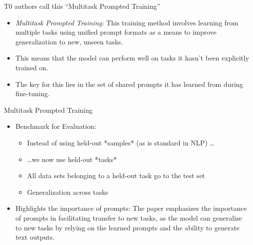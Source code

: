 
\begin{frame}{T0 authors call this ``Multitask Prompted
		Training''}

\vfill

\begin{itemize}
    \item \textit{Multitask Prompted Training:} This
    training method involves learning from multiple
    tasks using unified prompt formats as a means to improve
    generalization to new, unseen tasks.
    \item This means that the model can perform well on tasks it hasn't been explicitly trained on.
    \item The key for this lies in the set of shared prompts it has learned from during fine-tuning.
\end{itemize}

\vfill

\end{frame}


\begin{frame}{Multitask Prompted Training}

\vfill

\begin{itemize}
    \item Benchmark for Evaluation:
        \begin{itemize}
        \item Instead of using held-out *samples* (as is
        standard in NLP) \ldots
        \item \ldots we now use held-out *tasks*
            \item All data sets belonging to a held-out task go to the test set
            \item Generalization across tasks %
        \end{itemize}
    \item Highlights the importance of prompts: The paper
        emphasizes the importance of prompts in facilitating
        transfer to new tasks, as the model can generalize to new tasks by relying on the learned prompts and the ability to generate text outputs.
\end{itemize}

\vfill

\end{frame}

